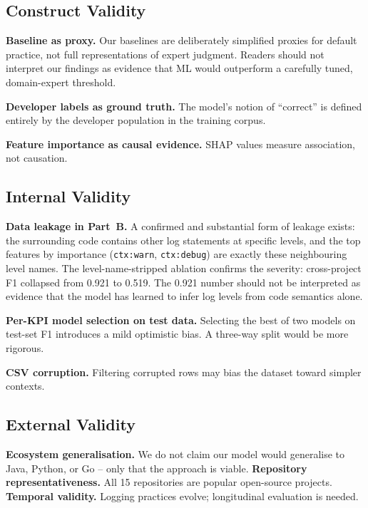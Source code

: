 \documentclass[10pt,twocolumn]{article}
\begin{document}
\subsection{Construct Validity}

\textbf{Baseline as proxy.} Our baselines are deliberately simplified proxies for default practice, not full representations of expert judgment. Readers should not interpret our findings as evidence that ML would outperform a carefully tuned, domain-expert threshold.

\textbf{Developer labels as ground truth.} The model's notion of ``correct'' is defined entirely by the developer population in the training corpus.

\textbf{Feature importance as causal evidence.} SHAP values measure association, not causation.

\subsection{Internal Validity}

\textbf{Data leakage in Part~B.} A confirmed and substantial form of leakage exists: the surrounding code contains other log statements at specific levels, and the top features by importance (\texttt{ctx:warn}, \texttt{ctx:debug}) are exactly these neighbouring level names. The level-name-stripped ablation confirms the severity: cross-project F1 collapsed from 0.921 to 0.519. The 0.921 number should not be interpreted as evidence that the model has learned to infer log levels from code semantics alone.

\textbf{Per-KPI model selection on test data.} Selecting the best of two models on test-set F1 introduces a mild optimistic bias. A three-way split would be more rigorous.

\textbf{CSV corruption.} Filtering corrupted rows may bias the dataset toward simpler contexts.

\subsection{External Validity}

\textbf{Ecosystem generalisation.} We do not claim our model would generalise to Java, Python, or Go -- only that the approach is viable. \textbf{Repository representativeness.} All 15 repositories are popular open-source projects. \textbf{Temporal validity.} Logging practices evolve; longitudinal evaluation is needed.

\end{document}
